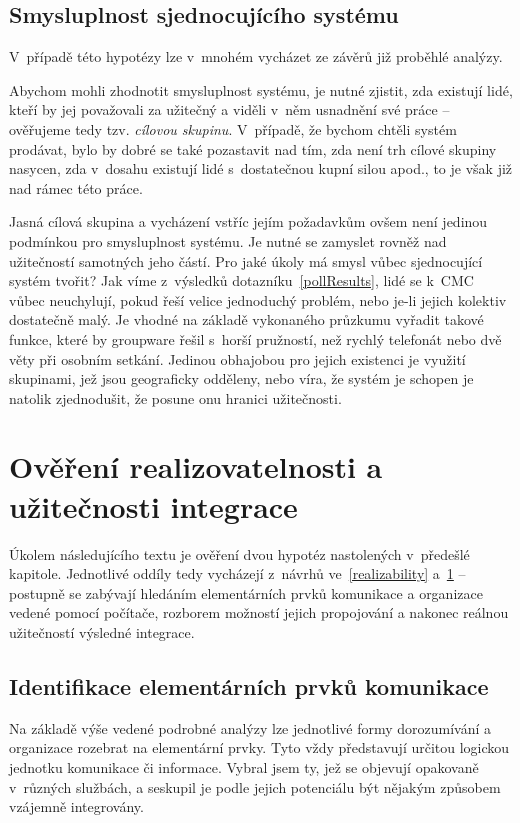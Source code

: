 \documentclass[12pt,oneside,final]{fithesis2}
\begin{document}
\section{Smysluplnost sjednocujícího systému}\label{meaningfulness}
V~případě této hypotézy lze v~mnohém vycházet ze závěrů již proběhlé analýzy.

Abychom mohli zhodnotit smysluplnost systému, je nutné zjistit, zda existují lidé, kteří by jej považovali za užitečný a viděli v~něm usnadnění své práce -- ověřujeme tedy tzv. \emph{cílovou skupinu}. V~případě, že bychom chtěli systém prodávat, bylo by dobré se také pozastavit nad tím, zda není trh cílové skupiny nasycen, zda v~dosahu existují lidé s~dostatečnou kupní silou apod., to je však již nad rámec této práce.

Jasná cílová skupina a vycházení vstříc jejím požadavkům ovšem není jedinou podmínkou pro smysluplnost systému. Je nutné se zamyslet rovněž nad užitečností samotných jeho částí. Pro jaké úkoly má smysl vůbec sjednocující systém tvořit? Jak víme z~výsledků dotazníku~\ref{pollResults}, lidé se k~CMC vůbec neuchylují, pokud řeší velice jednoduchý problém, nebo je-li jejich kolektiv dostatečně malý. Je vhodné na základě vykonaného průzkumu vyřadit takové funkce, které by groupware řešil s~horší pružností, než rychlý telefonát nebo dvě věty při osobním setkání. Jedinou obhajobou pro jejich existenci je využití skupinami, jež jsou geograficky odděleny, nebo víra, že systém je schopen je natolik zjednodušit, že posune onu hranici užitečnosti.



\chapter{Ověření realizovatelnosti a užitečnosti integrace}
Úkolem následujícího textu je ověření dvou hypotéz nastolených v~předešlé kapitole. Jednotlivé oddíly tedy vycházejí z~návrhů ve~\ref{realizability} a~\ref{meaningfulness} -- postupně se zabývají hledáním elementárních prvků komunikace a organizace vedené pomocí počítače, rozborem možností jejich propojování a nakonec reálnou užitečností výsledné integrace.


\section{Identifikace elementárních prvků komunikace}\label{communicationElements}
Na základě výše vedené podrobné analýzy lze jednotlivé formy dorozumívání a organizace rozebrat na elementární prvky. Tyto vždy představují určitou logickou jednotku komunikace či informace. Vybral jsem ty, jež se objevují opakovaně v~různých službách, a seskupil je podle jejich potenciálu být nějakým způsobem vzájemně integrovány.
\end{document}
